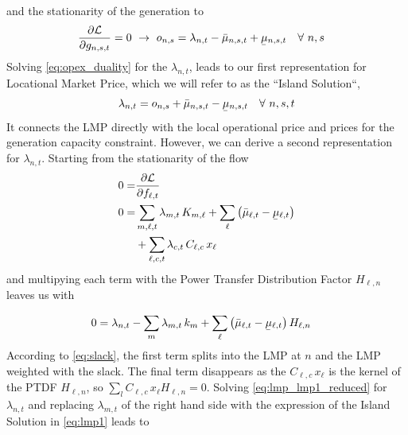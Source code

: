 \documentclass[11pt,twocolumn]{article}
\newcommand{\ubar}[1]{\underaccent{\bar}{#1}}
\newcommand{\generation}[1][n]{g_{#1,s,t}}
\newcommand{\opexGeneration}[1][n]{o_{#1,s}}
\newcommand{\incidence}[1][n]{K_{#1,\ell}}
\newcommand{\ptdf}[1][n]{H_{\ell,#1}}
\newcommand{\slack}[1][n]{k_{#1}}
\newcommand{\mulowergeneration}[1][n]{\ubar{\mu}_{#1,s,t}}
\newcommand{\muuppergeneration}[1][n]{\bar{\mu}_{#1,s,t}}
\newcommand{\mulowerflow}{\ubar{\mu}_{\ell,t}}
\newcommand{\muupperflow}{\bar{\mu}_{\ell,t}}
\newcommand{\lmp}[1][n]{\lambda_{#1,t}}
\newcommand{\flow}{f_{\ell,t}}
\newcommand{\cycle}{C_{\ell,c}}
\newcommand{\impedance}{x_\ell}
\newcommand{\cycleprice}{\lambda_{c,t}}
\newcommand{\lagrangian}{\mathcal{L}}
\newcommand{\Forall}[1]{\hspace{10pt} \forall \,\, #1 }
\newcommand{\pdv}[2]{\frac{\partial #1}{\partial #2}}
\begin{document}
and the stationarity of the generation to 
\begin{align}
\pdv{\lagrangian}{\generation} &= 0 \,\, \rightarrow \,\,  
\opexGeneration =  \lmp - \muuppergeneration + \mulowergeneration \Forall{n,s} \label{eq:opex_duality}
\end{align}
Solving \cref{eq:opex_duality} for the $\lmp$, leads to our first representation for Locational Market Price, which we will refer to as the ``Island Solution``,
\begin{align}
\lmp  =  \opexGeneration + \muuppergeneration - \mulowergeneration \Forall{n,s,t}
\label{eq:lmp1}
\end{align}
It connects the LMP directly with the local operational price and prices for the generation capacity constraint. However, we can derive a second representation for $\lmp$. Starting from the stationarity of the flow
\begin{align}
0 =& \pdv{\lagrangian}{\flow}  \\
\notag
0 =&  \sum_{m,\ell,t} \lmp[m] \, \incidence[m]  + \sum_{\ell} \left( \muupperflow - \mulowerflow \right)  \\
& +\sum_{\ell,c,t} \cycleprice \, \cycle \, \impedance
\end{align}
and multipying each term with the Power Transfer Distribution Factor $\ptdf$ leaves us with  

\begin{align}
0 &= \lmp - \sum_m \lmp[m] \, \slack[m]  + \sum_{\ell} \left( \muupperflow - \mulowerflow \right) \ptdf
\label{eq:lmp_lmp1_reduced}
\end{align}
According to \cref{eq:slack}, the first term splits into the LMP at $n$ and the LMP weighted with the slack. The final term disappears as the $\cycle \, \impedance$ is the kernel of the PTDF $\ptdf$, so $\sum_l \cycle \, \impedance \ptdf = 0$. Solving \cref{eq:lmp_lmp1_reduced} for $\lmp$ and replacing $\lmp[m]$ of the right hand side with the expression of the Island Solution in \cref{eq:lmp1} leads to 
\end{document}
